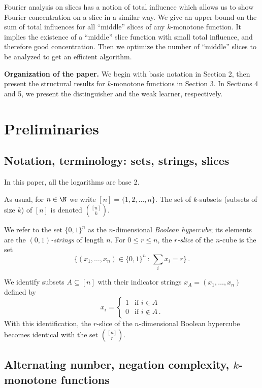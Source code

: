 \documentclass{toc}
\newcommand{\warn}[1]{#1}
\begin{document}
Fourier analysis on slices has a notion of total influence which allows us to show Fourier concentration on a slice in a similar way. We give an upper bound on the sum of total influences for all ``middle'' slices of any $k$-monotone function. It implies the existence of a ``middle'' slice function with small total influence, and therefore good concentration. Then we optimize the number of ``middle'' slices to be analyzed to get an efficient algorithm.

\vspace{2ex}
%
%
\noindent\textbf{Organization of the paper.} %
We begin with %
%
basic notation  %
in Section 2, then present the structural results for $k$-monotone functions
in Section 3. In Sections 4 and 5, we present the distinguisher and
the  %
%
%
weak learner, respectively.  %

\section{Preliminaries}
%
%
%
\subsection{Notation, terminology: sets, strings, slices}
\warn{In this paper, all the logarithms are base 2.}

As usual, for $n\in \N$ we write $[n]=\{1,2,\dots, n\}$.  The set of
$k$-subsets (subsets of size $k$) of $[n]$ is denoted $\binom{[n]}{k}$.

We refer to the set $\{0,1\}^n$ as the $n$-dimensional \emph{Boolean hypercube};
its elements are the \emph{$(0,1)$-strings} of length $n$.   
For $0\le r\le n$, the \emph{$r$-slice} of the $n$-cube is the set
\begin{equation}
\{(x_1,\ldots,x_n)\in\{0,1\}^n\,:\,\sum_i{x_i}=r\}\,.
\end{equation}
    
We identify subsets $A\subseteq [n]$ with their indicator strings
$x_A=(x_1,\dots,x_n)$ defined by
\begin{equation}
   x_i = \begin{cases} 1 & \mbox{if } i\in A\\
                       0 & \mbox{if } i\notin A\,.
         \end{cases}
\end{equation}
With this identification, the $r$-slice of the $n$-dimensional
Boolean hypercube becomes identical with the set $\binom{[n]}{r}$.   
%

%
\subsection{Alternating number, negation complexity, $k$-monotone functions}
\label{sec:k-mon}
\end{document}

